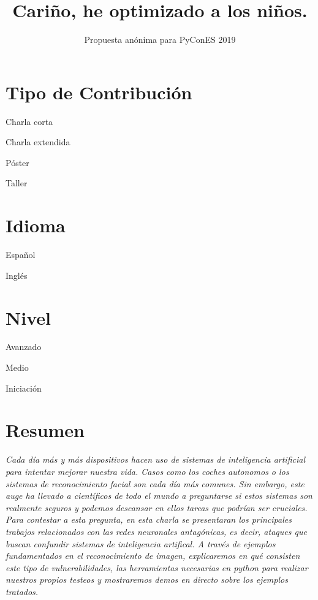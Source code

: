 \documentclass[runningheads]{llncs}
\newcommand{\cmark}{\ding{51}}%
\newcommand{\done}{\rlap{$\square$}{\raisebox{2pt}{\large\hspace{1pt}\cmark}}%
\hspace{-2.5pt}}
\begin{document}
\pagestyle{headings}
\mainmatter


\title{Cariño, he optimizado a los niños.} %


\author{Propuesta an\'onima para PyConES 2019}

\maketitle

\section{Tipo de Contribuci\'on}

\begin{todolist}
  \item Charla corta
  \item [\done]Charla extendida
  \item P\'oster
  \item Taller
  \end{todolist}


\section{Idioma}
\begin{todolist}
  \item [\done]Espa\~nol
  \item Ingl\'es
\end{todolist}
\section{Nivel}

\begin{todolist}
  \item Avanzado
  \item [\done] Medio
  \item Iniciaci\'on
  \end{todolist}


\newpage

\section{Resumen}
\textit{Cada d\'ia m\'as y m\'as dispositivos hacen uso de sistemas de inteligencia artificial para intentar mejorar nuestra vida. Casos como los coches autonomos o los sistemas de reconocimiento facial son cada día más comunes. Sin embargo, este auge ha llevado a cient\'ificos de todo el mundo a preguntarse si estos sistemas son realmente seguros y podemos descansar en ellos tareas que podrían ser cruciales. Para contestar a esta pregunta, en esta charla se presentaran los principales trabajos relacionados con las redes neuronales antag\'onicas, es decir, ataques que buscan confundir sistemas de inteligencia artifical. A trav\'es de ejemplos fundamentados en el reconocimiento de imagen, explicaremos en qu\'e consisten este tipo de vulnerabilidades, las herramientas necesarias en python para realizar nuestros propios testeos y mostraremos demos en directo sobre los ejemplos tratados.}
\end{document}
